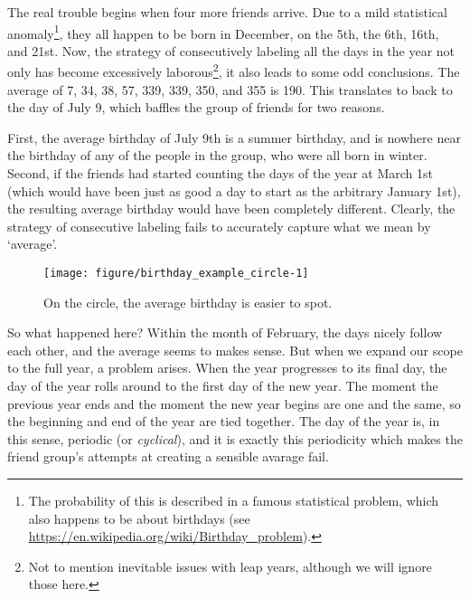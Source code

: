 \documentclass[12pt, a4paper]{book}\usepackage[]{graphicx}\usepackage[]{color}
\makeatletter
\def\maxwidth{ %
  \ifdim\Gin@nat@width>\linewidth
    \linewidth
  \else
    \Gin@nat@width
  \fi
}
\newenvironment{knitrout}{}{} %
\makeatother
\begin{document}
The real trouble begins when four more friends arrive. Due to a mild statistical anomaly\footnote{The probability of this is described in a famous statistical problem, which also happens to be about birthdays (see \url{https://en.wikipedia.org/wiki/Birthday_problem}).}, they all happen to be born in December, on the 5th, the 6th,  16th, and 21st. Now, the strategy of consecutively labeling all the days in the year not only has become excessively laborous\footnote{Not to mention inevitable issues with leap years, although we will ignore those here.}, it also leads to some odd conclusions. The average of 7, 34, 38, 57, 339, 339, 350, and 355 is 190. This translates to back to the day of July 9, which baffles the group of friends for two reasons.

First, the average birthday of July 9th is a summer birthday, and is nowhere near the birthday of any of the people in the group, who were all born in winter. Second, if the friends had started counting the days of the year at March 1st (which would have been just as good a day to start as the arbitrary January 1st), the resulting average birthday would have been completely different. Clearly, the strategy of consecutive labeling fails to accurately capture what we mean by `average'.



\begin{figure}
\begin{knitrout}
\color{fgcolor}
\texttt{[image: figure/birthday\_example\_circle-1]} 

\end{knitrout}
\caption{On the circle, the average birthday is easier to spot.}
\label{birthday_example}
\end{figure}



So what happened here? Within the month of February, the days nicely follow each other, and the average seems to makes sense. But when we expand our scope to the full year, a problem arises. When the year progresses to its final day, the day of the year rolls around to the first day of the new year. The moment the previous year ends and the moment the new year begins are one and the same, so the beginning and end of the year are tied together. The day of the year is, in this sense, periodic (or \textit{cyclical}), and it is exactly this periodicity which makes the friend group's attempts at creating a sensible avarage fail.
\end{document}

